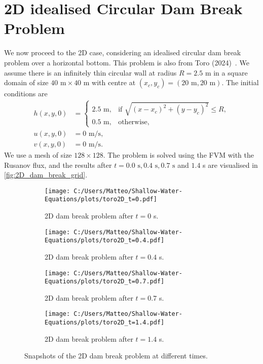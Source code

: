 \section{2D idealised Circular Dam Break Problem}\label{sec:2D_dam_break}
We now proceed to the 2D case, considering an idealised circular dam break problem over a horizontal bottom.
This problem is also from Toro (2024)~\cite{Toro2024}.
We assume there is an infinitely thin circular wall at radius $R = 2.5$ m in a square domain of size $40 \text{ m} \times 40 \text{ m}$ with centre at $(x_c,y_c) = (20 \text{ m}, 20 \text{ m})$.
The initial conditions are
\begin{align*}
    h(x,y,0) &= \begin{cases}
        2.5 \text{ m}, & \text{if } \sqrt{ {(x-x_c)}^2 + {(y-y_c)}^2 } \leq R, \\
        0.5 \text{ m}, & \text{otherwise},
    \end{cases} \\
    u(x,y,0) &= 0 \text{ m/s}, \\
    v(x,y,0) &= 0 \text{ m/s}.
\end{align*}
We use a mesh of size $128 \times 128$.
The problem is solved using the FVM with the Rusanov flux, and the results after $t=0.0 \text{ s}, 0.4 \text{ s}, 0.7 \text{ s}$ and $1.4$ s are visualised in \autoref{fig:2D_dam_break_grid}.
\begin{figure}[H]
    \centering
    \begin{subfigure}{0.49\textwidth}
        \centering
        \texttt{[image: C:/Users/Matteo/Shallow-Water-Equations/plots/toro2D\_t=0.pdf]}
        \caption{2D dam break problem after $t=0$ s.}\label{fig:2D_dam_break_t0}
    \end{subfigure}
    \hfill
    \begin{subfigure}{0.49\textwidth}
        \centering
        \texttt{[image: C:/Users/Matteo/Shallow-Water-Equations/plots/toro2D\_t=0.4.pdf]}
        \caption{2D dam break problem after $t=0.4$ s.}\label{fig:2D_dam_break_t0.4}
    \end{subfigure}

    \vspace{0.5cm} %

    \begin{subfigure}{0.49\textwidth}
        \centering
        \texttt{[image: C:/Users/Matteo/Shallow-Water-Equations/plots/toro2D\_t=0.7.pdf]}
        \caption{2D dam break problem after $t=0.7$ s.}\label{fig:2D_dam_break_t0.7}
    \end{subfigure}
    \hfill
    \begin{subfigure}{0.49\textwidth}
        \centering
        \texttt{[image: C:/Users/Matteo/Shallow-Water-Equations/plots/toro2D\_t=1.4.pdf]}
        \caption{2D dam break problem after $t=1.4$ s.}\label{fig:2D_dam_break_t1.4}
    \end{subfigure}

    \caption{Snapshots of the 2D dam break problem at different times.}\label{fig:2D_dam_break_grid}
\end{figure}
